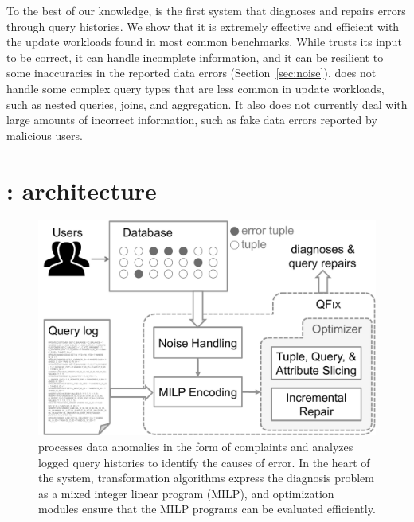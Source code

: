 To the best of our knowledge, \sys is the first system that diagnoses
and repairs errors through query histories. We show that it is
extremely effective and efficient with the update workloads found in
most common benchmarks. 
While \sys trusts its input to be correct, it
can handle incomplete information, and it can be resilient to some
inaccuracies in the reported data errors (Section~\ref{sec:noise}).
\sys does not handle some complex query types
that are less common in update workloads, such as nested queries,
joins, and aggregation. 
It also does not currently deal with large amounts of incorrect
information, such as fake data errors reported by malicious users.






\section{{\large\textbf{\sys}}: architecture}


\begin{figure}[t]
    \centering
        \includegraphics[scale=0.35]{figures/architecture}
    \caption{\sys processes data anomalies in the form of complaints and analyzes logged query histories to identify the causes of error. In the heart of the system, transformation algorithms express the diagnosis problem as a mixed integer linear program (MILP), and optimization modules ensure that the MILP programs can be evaluated efficiently.}
    \label{fig:architecture}
\end{figure}

